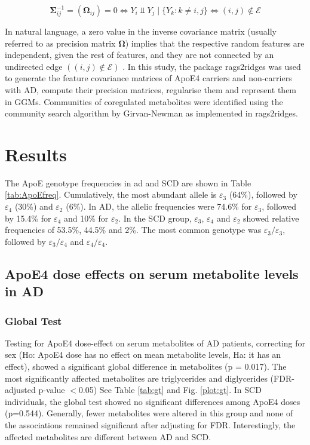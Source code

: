 \documentclass{amsart}
\begin{document}
\[ \mathbf{\Sigma}_{ij}^{-1} = (\mathbf{\Omega}_{ij})=0 \Longleftrightarrow Y_i \Perp Y_j\mid\{Y_k : k \neq i,j\} \Longleftrightarrow (i, j) \notin \mathcal{E} \]

In natural language, a zero value in the inverse covariance matrix (usually referred to as precision matrix $\mathbf{\Omega}$) implies that the respective random features are independent, given the rest of features, and they are not connected by an undirected edge $((i, j) \notin \mathcal{E})$ \cite{Peeters2022Rags2ridges:Matrices}. In this study, the package \textsf{rags2ridges} \cite{Peeters2022Rags2ridges:Matrices} was used to generate the feature covariance matrices of ApoE4 carriers and non-carriers with AD, compute their precision matrices, regularise them and represent them in GGMs. Communities of coregulated metabolites were identified using the community search algorithm by Girvan-Newman \cite{PhysRevE.69.026113} as implemented in \textsf{rags2ridges}.

\clearpage
\section{Results} \label{results}
The ApoE genotype frequencies in \acrshort{ad} and SCD are shown in Table \ref{tab:ApoEfreq}. Cumulatively, the most abundant allele is $\varepsilon_3$ (64\%), followed by $\varepsilon_4$ (30\%) and $\varepsilon_2$ (6\%). In AD, the allelic frequencies were 74.6\% for $\varepsilon_3$, followed by 15.4\% for $\varepsilon_4$ and 10\% for $\varepsilon_2$. In the SCD group, $\varepsilon_3$, $\varepsilon_4$ and $\varepsilon_2$ showed relative frequencies of 53.5\%, 44.5\% and 2\%. The most common genotype was $\varepsilon_3/\varepsilon_3$, followed by $\varepsilon_3/\varepsilon_4$ and $\varepsilon_4/\varepsilon_4$.
\subsection{ApoE4 dose effects on serum metabolite levels in AD}
\subsubsection{Global Test}
Testing for ApoE4 dose-effect on serum metabolites of AD patients, correcting for sex (Ho: ApoE4 dose has no effect on mean metabolite levels, Ha: it has an effect), showed a significant global difference in metabolites (p = 0.017). The most significantly affected metabolites are triglycerides and diglycerides (FDR-adjusted p-value $<$0.05) See Table \ref{tab:gt} and Fig. \ref{plot:gt}. In SCD individuals, the global test showed no significant differences among ApoE4 doses (p=0.544). Generally, fewer metabolites were altered in this group and none of the associations remained significant after adjusting for FDR. Interestingly, the affected metabolites are different between AD and SCD.
\end{document}
